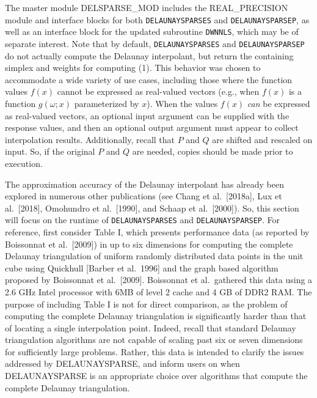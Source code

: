 The master module DELSPARSE\_MOD includes the REAL\_PRECISION module
and interface blocks for both {\tt DELAUNAYSPARSES} and
{\tt DELAUNAYSPARSEP}, as well as an interface block for the updated
subroutine {\tt DWNNLS}, which may be of separate interest. Note that by
default, {\tt DELAUNAYSPARSES} and {\tt DELAUNAYSPARSEP} do not actually
compute the Delaunay interpolant, but return the containing simplex and
weights for computing (1). This behavior was chosen to accommodate a wide
variety of use cases, including those where the function values $f(x)$
cannot be expressed as real-valued vectors (e.g., when $f(x)$ is a function
$g(\omega;x)$ parameterized by $x$). When the
values $f(x)$ {\it can} be expressed as real-valued vectors, an optional
input argument can be supplied with the response values, and then an
optional output argument must appear to collect interpolation results.
Additionally, recall that $P$ and $Q$ are shifted and rescaled on input.
So, if the original $P$ and $Q$ are needed, copies should
be made prior to execution.


The approximation accuracy of the Delaunay interpolant has already been
explored in numerous other publications (see Chang et al.\ [2018a],
Lux et al.\ [2018], Omohundro et al.\ [1990], and Schaap et al.\ [2000]).
So, this section will focus on the runtime of {\tt DELAUNAYSPARSES} and
{\tt DELAUNAYSPARSEP}. For reference, first consider Table I, which presents
performance data (as reported by Boissonnat et al.\ [2009]) in up to
six dimensions for computing the complete Delaunay triangulation of uniform
randomly distributed data points in the unit cube using
Quickhull [Barber et al.\ 1996] and the graph based algorithm proposed
by Boissonnat et al.\ [2009]. Boissonnat et al.\ gathered this data
using a 2.6 GHz Intel processor with 6MB of level 2 cache and 4 GB of
DDR2 RAM. The purpose of including Table I is not for direct comparison,
as the problem of computing the complete Delaunay triangulation
is significantly harder than that of locating a single interpolation
point. Indeed, recall that standard Delaunay triangulation algorithms
are not capable of scaling past six or seven dimensions for sufficiently
large problems. Rather, this data is intended to clarify the issues addressed
by DELAUNAYSPARSE, and inform users on when DELAUNAYSPARSE is an appropriate
choice over algorithms that compute the complete Delaunay triangulation.

